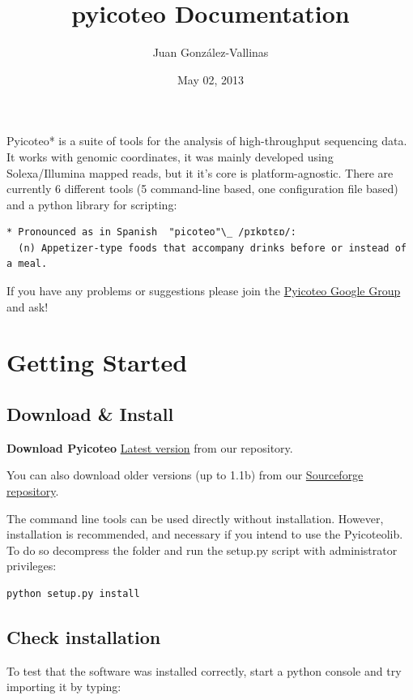 \documentclass[letterpaper,10pt,english]{sphinxmanual}
\title{pyicoteo Documentation}
\date{May 02, 2013}
\author{Juan González-Vallinas}
\begin{document}
\maketitle
\tableofcontents
{}\label{index::doc}


Pyicoteo* is a suite of tools for the analysis of high-throughput sequencing data. It works with genomic coordinates, it was mainly developed using Solexa/Illumina mapped reads, but it it's core is platform-agnostic. There are currently 6 different tools (5 command-line based, one configuration file based) and a python library for scripting:

\begin{Verbatim}[commandchars=\\\{\}]
* Pronounced as in Spanish  "picoteo"\_ /pɪkɒtɛɒ/:
  (n) Appetizer-type foods that accompany drinks before or instead of a meal.
\end{Verbatim}

If you have any problems or suggestions please join the \href{http://groups.google.com/group/pyicos}{Pyicoteo Google Group} and ask!


\chapter{Getting Started}
\label{index:welcome-to-pyicoteo}\label{index:getting-started}\label{index:pyicoteo-google-group}

\section{Download \& Install}
\label{index:download-install}
\textbf{Download Pyicoteo}  \href{https://bitbucket.org/regulatorygenomicsupf/pyicoteo/downloads}{Latest version} from our repository.

You can also download older versions (up to 1.1b) from our \href{http://sourceforge.net/projects/pyicos/}{Sourceforge repository}.

The command line tools can be used directly without installation. However, installation is recommended, and necessary if you intend to use the Pyicoteolib. To do so decompress the folder and run the setup.py script with administrator privileges:

\begin{Verbatim}[commandchars=\\\{\}]
python setup.py install
\end{Verbatim}


\section{Check installation}
\label{index:check-installation}
To test that the software was installed correctly, start a python console and try importing it by typing:
\end{document}
